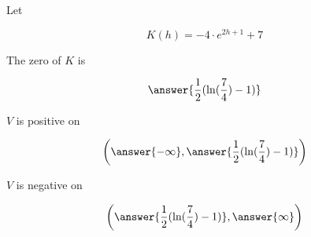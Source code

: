 \documentclass{ximera}
\author{Lee Wayand}
\begin{document}
\begin{exercise}





Let 


\[
K(h) = -4 \cdot e^{2h + 1} +7
\]





\begin{question}



The zero of $K$ is


\[
\answer{\frac{1}{2} (\ln(\frac{7}{4}) - 1)}
\]


\end{question}









\begin{question}



$V$ is positive on 


\[
\left( \answer{-\infty}, \answer{\frac{1}{2} (\ln(\frac{7}{4}) - 1)}  \right)
\]


\end{question}








\begin{question}



$V$ is negative on 


\[
\left( \answer{\frac{1}{2} (\ln(\frac{7}{4}) - 1)}, \answer{\infty}  \right)
\]


\end{question}









\end{exercise}
\end{document}
